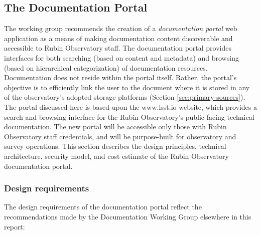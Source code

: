 \subsection{The Documentation Portal}

The working group recommends the creation of a \emph{documentation portal} web application as a means of making documentation content discoverable and accessible to Rubin Observatory staff.
The documentation portal provides interfaces for both searching (based on content and metadata) and browsing (based on hierarchical categorization) of documentation resources. Documentation does not reside within the portal itself.
Rather, the portal's objective is to efficiently link the user to the document where it is stored in any of the observatory's adopted storage platforms (Section \ref{sec:primary-sources}).
The portal discussed here is based upon the www.lsst.io website, which provides a search and browsing interface for the Rubin Observatory's public-facing technical documentation.
The new portal will be accessible only those with Rubin Observatory staff credentials, and will be purpose-built for observatory and survey operations.
This section describes the design principles, technical architecture, security model, and cost estimate of the Rubin Observatory documentation portal.

\subsubsection{Design requirements}

The design requirements of the documentation portal reflect the recommendations made by the Documentation Working Group elsewhere in this report:

